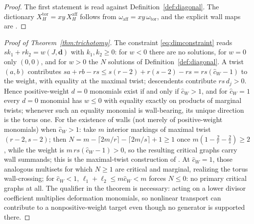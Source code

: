 \documentclass[11pt]{amsart}
\theoremstyle{definition}
\theoremstyle{remark}
\newcommand{\chat}{\hat{c}}
\begin{document}
\begin{proof}
The first statement is \cite[Prop.~2.39(b)]{GKT} read against
Definition~\ref{def:diagonal}. The dictionary $X_{H}^{\mathrm{tor}}
=xy\,X_{H}^{\mathrm{aff}}$ follows from $\omega_{\mathrm{aff}}
=xy\,\omega_{\mathrm{tor}}$, and the explicit wall maps are
\cite[Lem.~4.21]{GKT}.
\end{proof}

\begin{proof}[Proof of Theorem~\ref{thm:trichotomy}]
The constraint \eqref{eq:dimconstraint} reads $sk_{1}+rk_{2}=w(J,\mathbf d)$ with
$k_{1},k_{2}\ge0$: for $w<0$ there are no solutions, for $w=0$ only $(0,0)$, and
for $w>0$ the $N$ solutions of Definition~\ref{def:diagonal}. A twist $(a,b)$
contributes $sa+rb-rs\le s(r{-}2)+r(s{-}2)-rs=rs(\chat_{W}-1)$ to the weight, with
equality at the maximal twist; descendents contribute $rs\,d_{j}>0$. Hence
positive-weight $d=0$ monomials exist if and only if $\chat_{W}>1$, and for
$\chat_{W}=1$ every $d=0$ monomial has $w\le0$ with equality exactly on products of
marginal twists; whenever such an equality monomial is wall-bearing, its unique
direction is the torus one. For the
existence of walls (not merely of positive-weight monomials) when
$\chat_{W}>1$: take $m$ interior markings of maximal twist $(r{-}2,s{-}2)$;
then $N=m-\lceil2m/r\rceil-\lceil2m/s\rceil+1\ge1$ once
$m(1-\tfrac2r-\tfrac2s)\ge2$, while the weight is $m\,rs(\chat_{W}-1)>0$, so
the resulting critical graphs carry wall summands; this is the maximal-twist
construction of \cite{note}. At $\chat_{W}=1$, those analogous multisets for
which $N\ge1$ are critical and marginal, realizing the torus wall-crossing; for $\chat_{W}<1$,
$\ell_{1}+\ell_{2}\le m\chat_{W}<m$ forces $N\le0$: no primary critical graphs
at all. The qualifier in the theorem is necessary: acting on a lower divisor
coefficient multiplies deformation monomials, so nonlinear transport can
contribute to a nonpositive-weight target even though no generator is supported there.
\end{proof}
\end{document}
